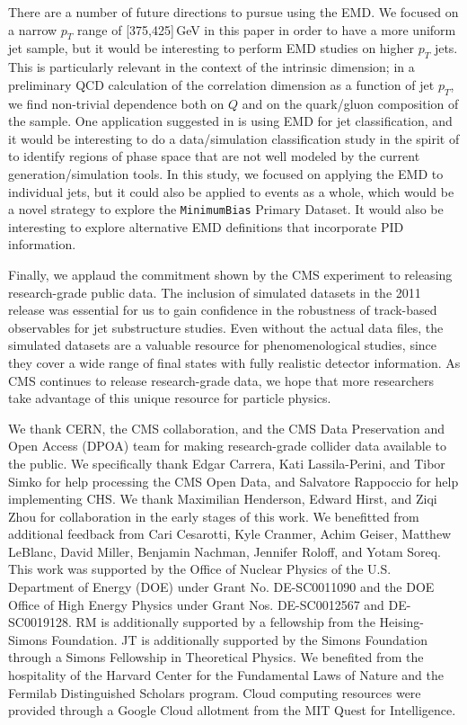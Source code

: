 \documentclass[aps,prd,twocolumn,preprintnumbers,nofootinbib,longbibliography,floatfix,superscriptaddress]{revtex4-1}
\begin{document}
There are a number of future directions to pursue using the EMD.
%
We focused on a narrow $p_T$ range of [375,425]\,GeV in this paper in order to have a more uniform jet sample, but it would be interesting to perform EMD studies on higher $p_T$ jets.
%
This is particularly relevant in the context of the intrinsic dimension; in a preliminary QCD calculation of the correlation dimension as a function of jet $p_T$, we find non-trivial dependence both on $Q$ and on the quark/gluon composition of the sample.
%
One application suggested in  is using EMD for jet classification, and it would be interesting to do a data/simulation classification study in the spirit of  to identify regions of phase space that are not well modeled by the current generation/simulation tools.
%
In this study, we focused on applying the EMD to individual jets, but it could also be applied to events as a whole, which would be a novel strategy to explore the \texttt{MinimumBias} Primary Dataset.
%
It would also be interesting to explore alternative EMD definitions that incorporate PID information.


Finally, we applaud the commitment shown by the CMS experiment to releasing research-grade public data.
%
The inclusion of simulated datasets in the 2011 release was essential for us to gain confidence in the robustness of track-based observables for jet substructure studies.
%
Even without the actual data files, the simulated datasets are a valuable resource for phenomenological studies, since they cover a wide range of final states with fully realistic detector information.
%
As CMS continues to release research-grade data, we hope that more researchers take advantage of this unique resource for particle physics.



\begin{acknowledgments}
%
We thank CERN, the CMS collaboration, and the CMS Data Preservation and Open Access (DPOA) team for making research-grade collider data available to the public.
%
We specifically thank Edgar Carrera, Kati Lassila-Perini, and Tibor Simko for help processing the CMS Open Data, and Salvatore Rappoccio for help implementing CHS.
%
We thank Maximilian Henderson, Edward Hirst, and Ziqi Zhou for collaboration in the early stages of this work.
%
We benefitted from additional feedback from Cari Cesarotti, Kyle Cranmer, Achim Geiser, Matthew LeBlanc, David Miller, Benjamin Nachman, Jennifer Roloff, and Yotam Soreq.
%
This work was supported by the Office of Nuclear Physics of the U.S. Department of Energy (DOE) under Grant No. DE-SC0011090 and the DOE Office of High Energy Physics under Grant Nos. DE-SC0012567 and DE-SC0019128.
%
RM is additionally supported by a fellowship from the Heising-Simons Foundation.
%
JT is additionally supported by the Simons Foundation through a Simons Fellowship in Theoretical Physics.
%
We benefited from the hospitality of the Harvard Center for the Fundamental Laws of Nature and the Fermilab Distinguished Scholars program.
%
Cloud computing resources were provided through a Google Cloud allotment from the MIT Quest for Intelligence.
%
\end{acknowledgments}
\end{document}
